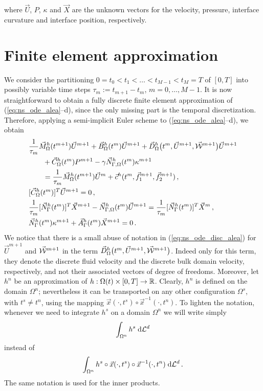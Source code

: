 where $\vec U$, $P$, $\kappa$ and $\vec X$ are the unknown vectors for the
velocity, pressure, interface curvature and interface position, respectively.

\section{Finite element approximation}\label{sec:ale_fem}
We consider the partitioning  $0= t_0 < t_1 < \ldots < t_{M-1} < t_M = T$ of
$[0,T]$ into possibly variable time steps $\tau_m := t_{m+1}-t_m$, $m=0
,\ldots, M-1$. It is now straightforward to obtain a fully discrete
finite element
approximation of (\ref{eq:ns_ode_alea}--d), since the only missing part is the
temporal discretization. Therefore, applying a semi-implicit Euler scheme to
(\ref{eq:ns_ode_alea}--d), we obtain
\begin{subequations}
\begin{align}
& \frac{1}{\tau_m}\vec M^h_\Omega(t^{m+1})\vec U^{m+1} +
\vec B^h_\Omega(t^m) \vec U^{m+1} +
\vec D^h_\Omega\big(t^m,\vec U^{m+1},\vec{\mathcal W}^{m+1}\big)\vec U^{m+1} \nonumber \\
& \qquad + \vec C^h_\Omega(t^m) P^{m+1}
- \gamma \vec{N}_{\Gamma,\Omega}^h(t^m) \kappa^{m+1} \nonumber \\
& \qquad = \frac{1}{\tau_m} \vec M^h_\Omega(t^{m+1})\vec U^m
+ \vec c^h(t^m,\vec f_1^{m+1},\vec f_2^{m+1})\,,\label{eq:ns_ode_disc_alea} \\
& [\vec C^h_\Omega(t^m) ]^T \vec U^{m+1} = 0\,,
\label{eq:ns_ode_disc_aleb} \\
& \frac{1}{\tau_m}[\vec N_\Gamma^h(t^m)]^T \vec X^{m+1}
- \vec{N}_{\Gamma,\Omega}^h(t^m)\vec U^{m+1} = \frac{1}{\tau_m}[\vec N_\Gamma^h(t^m)]^T
\vec X^m\,, \label{eq:ns_ode_disc_alec}\\
& \vec N_\Gamma^h(t^m) \kappa^{m+1} + \vec A^h_\Gamma(t^m)\vec X^{m+1}
 = 0\,. \label{eq:ns_ode_disc_aled}
\end{align}
\end{subequations}
We notice that there is a small abuse of notation in (\ref{eq:ns_ode_disc_alea})
for $\vec U^{m+1}$ and $\vec{\mathcal W}^{m+1}$ in the term $\vec D^h_\Omega\big(t^{m},\vec
U^{m+1},\vec{\mathcal W}^{m+1}\big)$. Indeed only for this term, they denote the discrete
fluid velocity and the discrete bulk domain velocity, respectively, and not
their associated vectors of degree of freedoms. Moreover, let $h^n$ be an
approximation of $h:\Omega(t)\times[0,T]\to\mathbb R$. Clearly, $h^n$ is
defined on the domain $\Omega^n$; nevertheless it can be transported on any
other configuration $\Omega^s$, with $t^s\neq t^n$, using the mapping
$\vec x(\cdot,t^s)\circ{\vec x}^{-1}(\cdot,t^n)$. To lighten the notation,
whenever we need to integrate $h^s$ on a domain $\Omega^n$ we will write simply
\begin{equation*}
\int_{\Omega^n} h^s \;{\rm d}{\cal L}^{d}
\end{equation*}
instead of
\begin{equation*}
\int_{\Omega^n} h^s\circ \vec x(\cdot,t^s)\circ{\vec x}^{-1}(\cdot,t^n)\;{\rm d}{\cal L}^{d}\,.
\end{equation*}
The same notation is used for the inner products.


